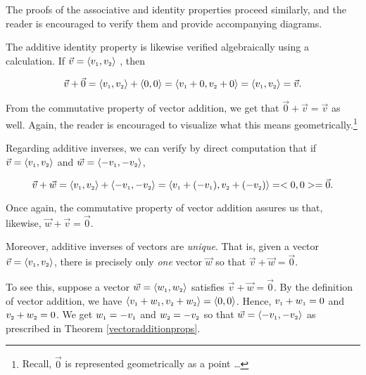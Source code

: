 \documentclass{ximera}
\begin{document}
The proofs of the associative and identity properties proceed similarly, and the reader is encouraged to verify them and provide accompanying diagrams.  

\smallskip

The additive identity property is likewise verified algebraically using a calculation.  If $\vec{v} = \left<v_{\mbox{\tiny $1$}},v_{\mbox{\tiny $2$}}\right>$ , then

 \[ \vec{v} + \vec{0} = \left<v_{\mbox{\tiny $1$}},v_{\mbox{\tiny $2$}}\right> + \left<0, 0\right> = \left< v_{\mbox{\tiny $1$}} + 0, v_{\mbox{\tiny $2$}} + 0 \right> =  \left<v_{\mbox{\tiny $1$}},v_{\mbox{\tiny $2$}}\right>  = \vec{v}.\]
 
 From the commutative property of vector addition, we get that $\vec{0} + \vec{v} = \vec{v}$ as well.  Again, the reader is encouraged to visualize what this means geometrically.\footnote{Recall, $\vec{0}$ is represented geometrically as a point \ldots}
 
\smallskip

Regarding additive inverses, we can verify by direct computation that if $\vec{v} = \left< v_{\mbox{\tiny $1$}}, v_{\mbox{\tiny $2$}} \right>$ and  $\vec{w} = \left< - v_{\mbox{\tiny $1$}}, -v_{\mbox{\tiny $2$}} \right>$, 

\[ \vec{v} + \vec{w} = \left< v_{\mbox{\tiny $1$}}, v_{\mbox{\tiny $2$}} \right> + \left< - v_{\mbox{\tiny $1$}}, -v_{\mbox{\tiny $2$}} \right> = \left<  v_{\mbox{\tiny $1$}} + ( - v_{\mbox{\tiny $1$}}), v_{\mbox{\tiny $2$}} + ( - v_{\mbox{\tiny $2$}}) \right> = <0,0> = \vec{0}.\]

Once again, the commutative property of vector addition assures us  that, likewise, $\vec{w} + \vec{v} = \vec{0}$.

\smallskip

Moreover, additive inverses of vectors are \textit{unique}.    That is, given a vector $\vec{v} = \left<v_{\mbox{\tiny $1$}}, v_{\mbox{\tiny $2$}}\right>$, there is precisely only \textit{one} vector $\vec{w}$ so that $\vec{v} + \vec{w} = \vec{0}$.

\smallskip

To see this, suppose a vector $\vec{w} = \left<w_{\mbox{\tiny $1$}},w_{\mbox{\tiny $2$}}\right>$ satisfies  $\vec{v} + \vec{w} = \vec{0}$.  By the definition of vector addition, we have $\left<v_{\mbox{\tiny $1$}} + w_{\mbox{\tiny $1$}}, v_{\mbox{\tiny $2$}} + w_{\mbox{\tiny $2$}}\right> = \left<0,0\right>$.  Hence, $v_{\mbox{\tiny $1$}} + w_{\mbox{\tiny $1$}} = 0$ and $v_{\mbox{\tiny $2$}} + w_{\mbox{\tiny $2$}} = 0$.  We get $w_{\mbox{\tiny $1$}} = -v_{\mbox{\tiny $1$}}$ and $w_{\mbox{\tiny $2$}}  = -v_{\mbox{\tiny $2$}} $ so that $\vec{w} = \left<-v_{\mbox{\tiny $1$}} , -v_{\mbox{\tiny $2$}} \right>$ as prescribed in Theorem \ref{vectoradditionprops}.  
\end{document}
